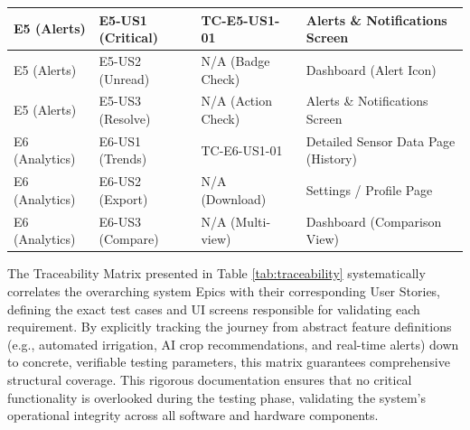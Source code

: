 {\begin{longtable}{|p{2cm}|p{4cm}|p{3cm}|p{3cm}|}
E5 (Alerts) & E5-US1 (Critical) & TC-E5-US1-01 & Alerts \& 
Notifications Screen \\ \hline
E5 (Alerts) & E5-US2 (Unread) & N/A (Badge Check) & Dashboard 
(Alert Icon) \\ \hline
E5 (Alerts) & E5-US3 (Resolve) & N/A (Action Check) & Alerts \& 
Notifications Screen \\ \hline

E6 (Analytics) & E6-US1 (Trends) & TC-E6-US1-01 & Detailed Sensor 
Data Page (History) \\ \hline
E6 (Analytics) & E6-US2 (Export) & N/A (Download) & Settings / 
Profile Page \\ \hline
E6 (Analytics) & E6-US3 (Compare) & N/A (Multi-view) & Dashboard 
(Comparison View) \\ \hline
\end{longtable}
}

The Traceability Matrix presented in Table \ref{tab:traceability} systematically correlates the overarching system Epics with their corresponding User Stories, defining the exact test cases and UI screens responsible for validating each requirement. By explicitly tracking the journey from abstract feature definitions (e.g., automated irrigation, AI crop recommendations, and real-time alerts) down to concrete, verifiable testing parameters, this matrix guarantees comprehensive structural coverage. This rigorous documentation ensures that no critical functionality is overlooked during the testing phase, validating the system's operational integrity across all software and hardware components.

\setcounter{chapter}{2}